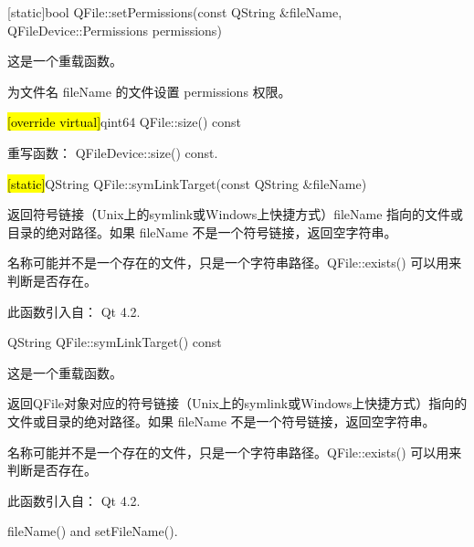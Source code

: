 \splitLine

[static]bool QFile::setPermissions(const QString \&fileName, QFileDevice::Permissions permissions)

这是一个重载函数。

为文件名 fileName 的文件设置 permissions 权限。

\hl{[override virtual]}qint64 QFile::size() const

重写函数： QFileDevice::size() const.

\splitLine

\hl{[static]}QString QFile::symLinkTarget(const QString \&fileName)

返回符号链接（Unix上的symlink或Windows上快捷方式）fileName 指向的文件或目录的绝对路径。如果 fileName 不是一个符号链接，返回空字符串。

名称可能并不是一个存在的文件，只是一个字符串路径。QFile::exists() 可以用来判断是否存在。

此函数引入自： Qt 4.2.

\splitLine

QString QFile::symLinkTarget() const

这是一个重载函数。

返回QFile对象对应的符号链接（Unix上的symlink或Windows上快捷方式）指向的文件或目录的绝对路径。如果 fileName 不是一个符号链接，返回空字符串。

名称可能并不是一个存在的文件，只是一个字符串路径。QFile::exists() 可以用来判断是否存在。

此函数引入自： Qt 4.2.

\begin{notice}[另请参阅]
fileName() and setFileName().
\end{notice}
